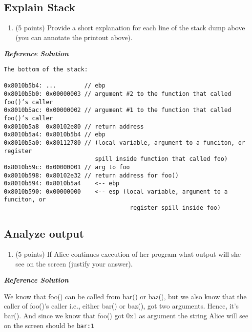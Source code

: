\documentclass[]{article}
\providecommand{\tightlist}{%
  \setlength{\itemsep}{0pt}\setlength{\parskip}{0pt}}
\begin{document}
\hypertarget{explain-stack}{%
\subsection{Explain Stack}\label{explain-stack}}

\begin{enumerate}
\def\labelenumi{(\alph{enumi})}
\tightlist
\item
  (5 points) Provide a short explanation for each line of the stack dump
  above (you can annotate the printout above).
\end{enumerate}

\textbf{\emph{Reference Solution}}

\begin{verbatim}
The bottom of the stack:

0x8010b5b4: ...        // ebp
0x8010b5b0: 0x00000003 // argument #2 to the function that called foo()’s caller
0x8010b5ac: 0x00000002 // argument #1 to the function that called foo()’s caller
0x8010b5a8  0x80102e80 // return address
0x8010b5a4: 0x8010b5b4 // ebp
0x8010b5a0: 0x80112780 // (local variable, argument to a funciton, or register
                          spill inside function that called foo)
0x8010b59c: 0x00000001 // arg to foo
0x8010b598: 0x80102e32 // return address for foo()
0x8010b594: 0x8010b5a4    <-- ebp
0x8010b590: 0x00000000    <-- esp (local variable, argument to a funciton, or 
                                    register spill inside foo)
\end{verbatim}

\hypertarget{analyze-output}{%
\subsection{Analyze output}\label{analyze-output}}

\begin{enumerate}
\def\labelenumi{(\alph{enumi})}
\setcounter{enumi}{1}
\tightlist
\item
  (5 points) If Alice continues execution of her program what output
  will she see on the screen (justify your answer).
\end{enumerate}

\textbf{\emph{Reference Solution}}

We know that foo() can be called from bar() or baz(), but we also know
that the caller of foo()'s caller i.e., either bar() or baz(), got two
arguments. Hence, it's bar(). And since we know that foo() got 0x1 as
argument the string Alice will see on the screen should be
\texttt{bar:1}
\end{document}
